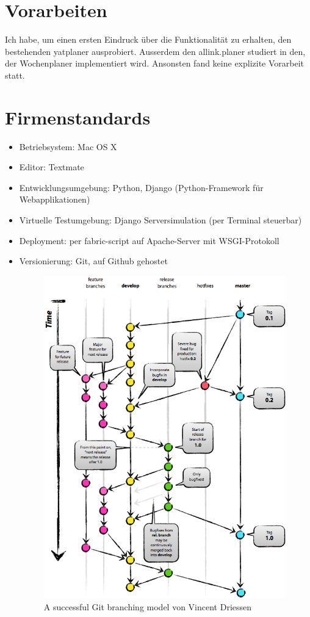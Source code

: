 \section{Vorarbeiten}
Ich habe, um einen ersten Eindruck über die Funktionalität zu erhalten, den bestehenden yatplaner ausprobiert.
Ausserdem den allink.planer studiert in den, der Wochenplaner implementiert wird.
Ansonsten fand keine explizite Vorarbeit statt.

\section{Firmenstandards}
\begin{itemize}
    \item Betriebsystem: Mac OS X
    \item Editor: Textmate
    \item Entwicklungsumgebung: Python, Django (Python-Framework für Webapplikationen)
    \item Virtuelle Testumgebung: Django Serversimulation (per Terminal steuerbar)
    \item Deployment: per fabric-script auf Apache-Server mit WSGI-Protokoll
    \item Versionierung: Git, auf Github gehostet
    \begin{figure}[!ht]
    \begin{center}
    \includegraphics[width=0.99\textwidth,angle=0]{./bilder/git.png}
    \caption{A successful Git branching model von Vincent Driessen}
    \end{center}
    \end{figure}
\end{itemize}
